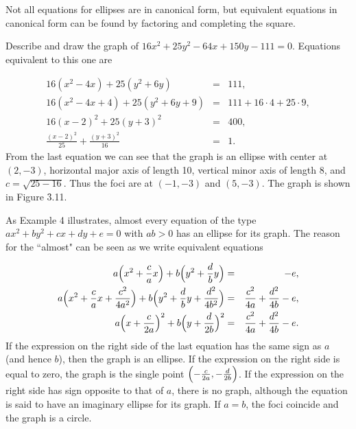 \begin{example}
Not all equations for ellipses are in canonical form, but equivalent equations in canonical form can be found by factoring and completing the square.
\end{example}
\medskip

\begin{example}
Describe and draw the graph of $16x^2 + 25y^2 - 64x + 150y - 111 = 0$. Equations equivalent to this one are

\begin{eqnarray*} 
                16(x^2 - 4x) + 25(y^2 + 6y) &=& 111,\\
    16(x^2 - 4x + 4) + 25(y^2 + 6y + 9) &=& 111 + 16 \cdot 4 + 25 \cdot 9, \\
                    16(x - 2)^2 + 25(y + 3)^2 &=& 400,\\
\frac{(x - 2)^2}{25} + \frac{(y + 3)^2}{16} &=& 1.
\end{eqnarray*}
\noindent From the last equation we can see that the graph is an ellipse with center at $(2, -3)$, horizontal major axis of length 10, vertical minor axis of length 8, and $c = \sqrt{25 - 16}$. Thus the foci are at $(-1, -3)$ and $(5, -3)$. The graph is shown in Figure \f{3.11}.
\end{example}
\medskip

As Example 4 illustrates, almost every equation of the type $ax^2 + by^2 + cx + dy + e = 0$ with $ab > 0$ has an ellipse for its graph. The reason for the ``almost" can be seen as we write equivalent equations

\begin{eqnarray*}
a \Bigl(x^2 + \frac{c}{a} x \Bigr) + b \Bigl( y^2 + \frac{d}{b} y \Bigr) &=& - e,\\
a \Bigl(x^2 + \frac{c}{a} x + \frac{c^2}{4a^2} \Bigr) + b \Bigl( y^2 + \frac{d}{b} y + \frac{d^2}{4b^2} \Bigr)
&=& \frac{c^2}{4a} + \frac{d^2}{4b} - e,\\ 
a \Bigl(x + \frac{c}{2a} \Bigr)^2 + b \Bigl( y + \frac{d}{2b} \Bigr)^2 &=& \frac{c^2}{4a} + \frac{d^2}{4b} - e.
\end{eqnarray*}
\noindent If the expression on the right side of the last equation has the same sign as $a$ (and hence $b$), then the graph is an ellipse. If the expression on the right side is equal to zero, the graph is the single point $\Bigl(-\frac{c}{2a}, -\frac{d}{2b} \Bigr)$. If the expression on the right side has sign opposite to that of $a$, there is no graph, although the equation is said to have an imaginary ellipse for its graph. If $a = b$, the foci coincide and the graph is a circle.





